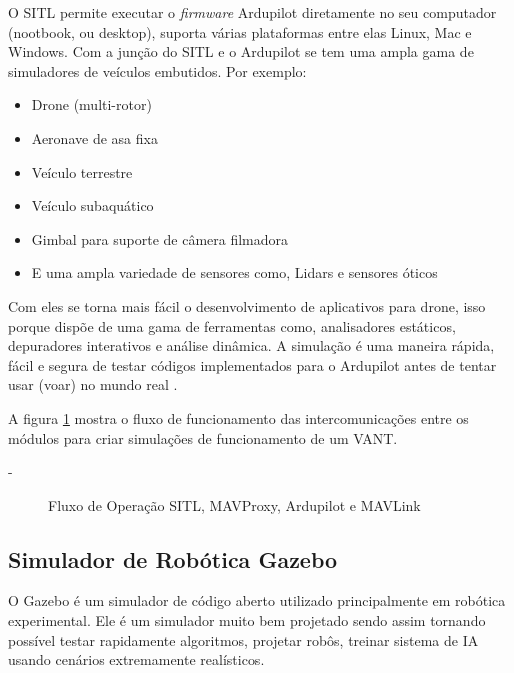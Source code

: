 O SITL permite executar o \textit{firmware} Ardupilot diretamente no seu computador (nootbook, ou desktop), suporta várias plataformas entre elas Linux, Mac e Windows.
Com a junção do SITL e o Ardupilot se tem uma ampla gama de simuladores de veículos embutidos. Por exemplo:
\begin{itemize}
	\item Drone (multi-rotor)
	\item Aeronave de asa fixa
	\item Veículo terrestre
	\item Veículo subaquático
	\item Gimbal para suporte de câmera filmadora
	\item E uma ampla variedade de sensores como, Lidars e sensores óticos
\end{itemize}

Com eles se torna mais fácil o desenvolvimento de aplicativos para drone, isso porque dispõe de uma gama de ferramentas como, analisadores estáticos, depuradores interativos e análise dinâmica. A simulação é uma maneira rápida, fácil e segura de testar códigos implementados para o Ardupilot antes de tentar usar (voar) no mundo real \cite{vinteseis}. 

A figura \ref{fig:ardupilot} mostra o fluxo de funcionamento das intercomunicações entre os módulos para criar simulações de funcionamento de um VANT.

-
\begin{figure}[H]
	\centering
	\caption{Fluxo de Operação SITL, MAVProxy, Ardupilot e MAVLink}
	\fontsize{9pt}{12pt}\selectfont
	\color{white}
	\def\svgwidth{15cm}
	
	\label{fig:ardupilot}
\end{figure}

\subsection{Simulador de Robótica Gazebo}
O Gazebo é um simulador de código aberto utilizado principalmente em robótica experimental. Ele é um simulador muito bem projetado sendo assim tornando possível testar rapidamente algoritmos, projetar robôs, treinar sistema de IA usando cenários extremamente realísticos. 

